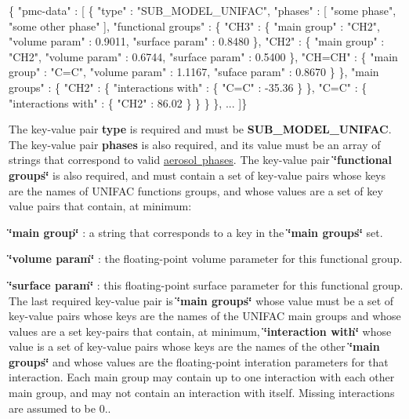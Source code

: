 \begin{DoxyCode}
\{ "pmc-data" : [
  \{
    "type" : "SUB\_MODEL\_UNIFAC",
    "phases" : [
      "some phase",
      "some other phase"
    ],
    "functional groups" : \{
      "CH3" : \{
        "main group" : "CH2",
        "volume param" : 0.9011,
        "surface param" : 0.8480
      \},
      "CH2" : \{
        "main group" : "CH2",
        "volume param" : 0.6744,
        "surface param" : 0.5400
      \},
      "CH=CH" : \{
        "main group" : "C=C",
        "volume param" : 1.1167,
        "suface param" : 0.8670
      \}
    \},
    "main groups" : \{
      "CH2" : \{
        "interactions with" : \{
          "C=C" : -35.36
        \}
      \},
      "C=C" : \{
        "interactions with" : \{
          "CH2" : 86.02
        \}
      \}
    \}
  \},
  ...
]\}
\end{DoxyCode}
 The key-\/value pair {\bfseries type} is required and must be {\bfseries S\+U\+B\+\_\+\+M\+O\+D\+E\+L\+\_\+\+U\+N\+I\+F\+AC}. The key-\/value pair {\bfseries phases} is also required, and its value must be an array of strings that correspond to valid \mbox{\hyperlink{phlex_aero_phase}{aerosol phases}}. The key-\/value pair {\bfseries \char`\"{}functional
 groups\char`\"{}} is also required, and must contain a set of key-\/value pairs whose keys are the names of U\+N\+I\+F\+AC functions groups, and whose values are a set of key value pairs that contain, at minimum\+:
\begin{DoxyItemize}
\item {\bfseries \char`\"{}main group\char`\"{}} \+: a string that corresponds to a key in the {\bfseries \char`\"{}main groups\char`\"{}} set.
\item {\bfseries \char`\"{}volume param\char`\"{}} \+: the floating-\/point volume parameter for this functional group.
\item {\bfseries \char`\"{}surface param\char`\"{}} \+: this floating-\/point surface parameter for this functional group. The last required key-\/value pair is {\bfseries \char`\"{}main groups\char`\"{}} whose value must be a set of key-\/value pairs whose keys are the names of the U\+N\+I\+F\+AC main groups and whose values are a set key-\/pairs that contain, at minimum, {\bfseries \char`\"{}interaction with\char`\"{}} whose value is a set of key-\/value pairs whose keys are the names of the other {\bfseries \char`\"{}main groups\char`\"{}} and whose values are the floating-\/point interation parameters for that interaction. Each main group may contain up to one interaction with each other main group, and may not contain an interaction with itself. Missing interactions are assumed to be 0..
\end{DoxyItemize}

